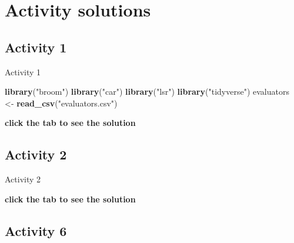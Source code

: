 \documentclass[]{book}
\newenvironment{Shaded}{\begin{snugshade}}{\end{snugshade}}
\newcommand{\DataTypeTok}[1]{\textcolor[rgb]{0.13,0.29,0.53}{#1}}
\newcommand{\KeywordTok}[1]{\textcolor[rgb]{0.13,0.29,0.53}{\textbf{#1}}}
\newcommand{\NormalTok}[1]{#1}
\newcommand{\OperatorTok}[1]{\textcolor[rgb]{0.81,0.36,0.00}{\textbf{#1}}}
\newcommand{\StringTok}[1]{\textcolor[rgb]{0.31,0.60,0.02}{#1}}
\begin{document}
\hypertarget{activity-solutions-5}{%
\section{Activity solutions}\label{activity-solutions-5}}

\hypertarget{activity-1-3}{%
\subsection{Activity 1}\label{activity-1-3}}

Activity 1

\begin{Shaded}
\begin{Highlighting}[]
\KeywordTok{library}\NormalTok{(}\StringTok{"broom"}\NormalTok{)}
\KeywordTok{library}\NormalTok{(}\StringTok{"car"}\NormalTok{)}
\KeywordTok{library}\NormalTok{(}\StringTok{"lsr"}\NormalTok{)}
\KeywordTok{library}\NormalTok{(}\StringTok{"tidyverse"}\NormalTok{)}
\NormalTok{evaluators <-}\StringTok{ }\KeywordTok{read_csv}\NormalTok{(}\StringTok{"evaluators.csv"}\NormalTok{)}
\end{Highlighting}
\end{Shaded}

\textbf{click the tab to see the solution}

\hypertarget{activity-2-1}{%
\subsection{Activity 2}\label{activity-2-1}}

Activity 2

\begin{Shaded}
\end{Shaded}

\textbf{click the tab to see the solution}

\hypertarget{activity-6-1}{%
\subsection{Activity 6}\label{activity-6-1}}
\end{document}

